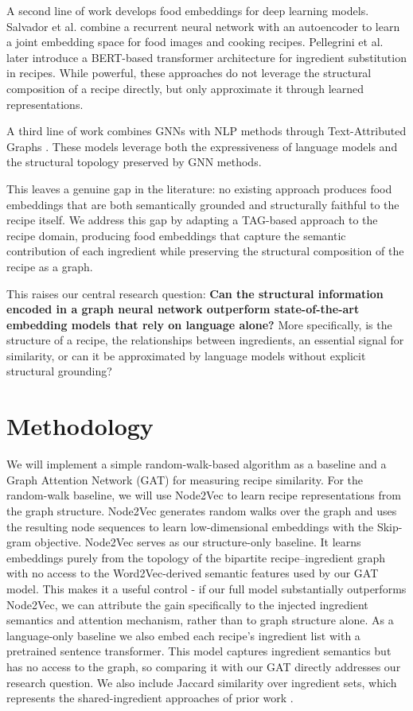 \documentclass{article}
\begin{document}
A second line of work develops food embeddings for deep learning models. Salvador et al. \cite{salvador2017learning} combine a recurrent neural network with an autoencoder to learn a joint embedding space for food images and cooking recipes. Pellegrini et al. \cite{pellegrini_exploiting_2021} later introduce a BERT-based transformer architecture \cite{devlin_bert_2019} for ingredient substitution in recipes. While powerful, these approaches do not leverage the structural composition of a recipe directly, but only approximate it through learned representations.

A third line of work combines GNNs with NLP methods through Text-Attributed Graphs \cite{yan_comprehensive_nodate}. These models leverage both the expressiveness of language models and the structural topology preserved by GNN methods.

This leaves a genuine gap in the literature: no existing approach produces food embeddings that are both semantically grounded and structurally faithful to the recipe itself. We address this gap by adapting a TAG-based approach to the recipe domain, producing food embeddings that capture the semantic contribution of each ingredient while preserving the structural composition of the recipe as a graph. 

This raises our central research question: \textbf {Can the structural information encoded in a graph neural network outperform state-of-the-art embedding models that rely on language alone?} More specifically, is the structure of a recipe, the relationships between ingredients, an essential signal for similarity, or can it be approximated by language models without explicit structural grounding?



\section{Methodology} 

We will implement a simple random-walk-based algorithm as a baseline and a Graph Attention Network (GAT) for measuring recipe similarity. For the random-walk baseline, we will use Node2Vec to learn recipe representations from the graph structure. Node2Vec generates random walks over the graph and uses the resulting node sequences to learn low-dimensional embeddings with the Skip-gram objective. Node2Vec serves as our structure-only baseline. It learns embeddings purely from the topology of the bipartite recipe–ingredient graph with no access to the Word2Vec-derived semantic features used by our GAT model. This makes it a useful control - if our full model substantially outperforms Node2Vec, we can attribute the gain specifically to the injected ingredient semantics and attention mechanism, rather than to graph structure alone. As a language-only baseline we also embed each recipe's ingredient list with a pretrained sentence transformer. This model captures ingredient semantics but has no access to the graph, so comparing it with our GAT directly addresses our research question. We also include Jaccard similarity over ingredient sets, which represents the shared-ingredient approaches of prior work \cite{bellingeri_recipe_2025,kular_using_2011}.
\end{document}
